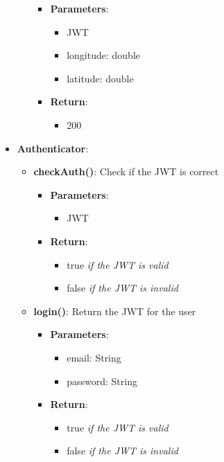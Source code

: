 \documentclass{article}
\begin{document}
\begin{itemize}
\begin{itemize}
				\begin{itemize}
					\item \textbf{Parameters}:
						\begin{itemize}
							\item JWT
							\item longitude: double
							\item latitude: double
						\end{itemize}
					\item \textbf{Return}:
						\begin{itemize}
							\item 200
						\end{itemize}
				\end{itemize}
		\end{itemize}
	\item \textbf{Authenticator}:
		\begin{itemize}
			\item \textbf{checkAuth()}:
				Check if the JWT is correct
				\begin{itemize}
					\item \textbf{Parameters}:
						\begin{itemize}
							\item JWT
						\end{itemize}
					\item \textbf{Return}:
						\begin{itemize}
							\item true \textit{if the JWT is valid}
							\item false \textit{if the JWT is invalid}
						\end{itemize}
				\end{itemize}
			\item \textbf{login()}:
				Return the JWT for the user
				\begin{itemize}
					\item \textbf{Parameters}:
						\begin{itemize}
							\item email: String
							\item password: String
						\end{itemize}
					\item \textbf{Return}:
						\begin{itemize}
							\item true \textit{if the JWT is valid}
							\item false \textit{if the JWT is invalid}
						\end{itemize}

\end{itemize}
\end{itemize}
\end{itemize}
\end{document}
